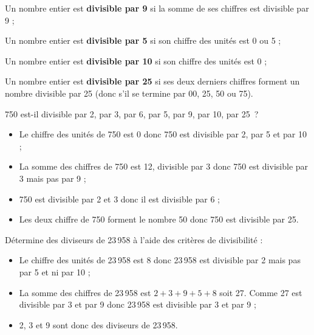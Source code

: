 \begin{methode*1}
\begin{aconnaitre}
Un nombre entier est \textbf{\textcolor{A1}{divisible par 9}} si la somme de ses chiffres est divisible par 9 ;

Un nombre entier est \textbf{\textcolor{A1}{divisible par 5}} si son chiffre des unités est 0 ou 5 ;

Un nombre entier est \textbf{\textcolor{A1}{divisible par 10}} si son chiffre des unités est 0 ;

Un nombre entier est \textbf{\textcolor{A1}{divisible par 25}} si ses deux derniers chiffres forment un nombre divisible par 25 (donc s'il se termine par 00, 25, 50 ou 75).
\end{aconnaitre}

\begin{exemple*1}
750 est-il divisible par 2, par 3, par 6, par 5, par 9, par 10, par 25 ?
\begin{itemize}
 \item Le chiffre des unités de 750 est 0 donc 750 est divisible par 2, par 5 et par 10 ;
 \item La somme des chiffres de 750 est 12, divisible par 3 donc 750 est divisible par 3 mais pas par 9 ;
 \item 750 est divisible par 2 et 3 donc il est divisible par 6 ;
 \item Les deux  chiffre de 750 forment le nombre 50 donc 750 est divisible par 25.
 \end{itemize}
 \end{exemple*1}
 
 \begin{exemple*1}
Détermine des diviseurs de 23\,958 à l'aide des critères de divisibilité :
\begin{itemize}
 \item Le chiffre des unités de 23\,958 est 8 donc 23\,958 est divisible par 2 mais pas par 5 et ni par 10 ;
 \item La somme des chiffres de 23\,958 est $2 + 3 + 9 + 5 + 8$ soit 27. Comme 27 est divisible par 3 et par 9 donc 23\,958 est divisible par 3 et par 9 ;
 \item 2, 3 et 9 sont donc des diviseurs de 23\,958.
 \end{itemize}
 \end{exemple*1}


\end{methode*1}
